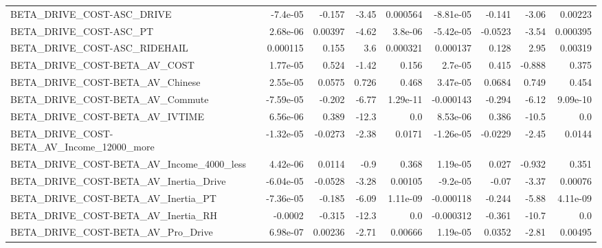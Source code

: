 \begin{tabular}{lrrrrrrrr}
BETA\_DRIVE\_COST-ASC\_DRIVE                          &    -7.4e-05 &       -0.157 &    -3.45 & 0.000564 &  -8.81e-05 &      -0.141 &        -3.06 &       0.00223 \\
BETA\_DRIVE\_COST-ASC\_PT                             &    2.68e-06 &      0.00397 &    -4.62 &  3.8e-06 &  -5.42e-05 &     -0.0523 &        -3.54 &      0.000395 \\
BETA\_DRIVE\_COST-ASC\_RIDEHAIL                       &    0.000115 &        0.155 &      3.6 & 0.000321 &   0.000137 &       0.128 &         2.95 &       0.00319 \\
BETA\_DRIVE\_COST-BETA\_AV\_COST                       &    1.77e-05 &        0.524 &    -1.42 &    0.156 &    2.7e-05 &       0.415 &       -0.888 &         0.375 \\
BETA\_DRIVE\_COST-BETA\_AV\_Chinese                    &    2.55e-05 &       0.0575 &    0.726 &    0.468 &   3.47e-05 &      0.0684 &        0.749 &         0.454 \\
BETA\_DRIVE\_COST-BETA\_AV\_Commute                    &   -7.59e-05 &       -0.202 &    -6.77 & 1.29e-11 &  -0.000143 &      -0.294 &        -6.12 &      9.09e-10 \\
BETA\_DRIVE\_COST-BETA\_AV\_IVTIME                     &    6.56e-06 &        0.389 &    -12.3 &      0.0 &   8.53e-06 &       0.386 &        -10.5 &           0.0 \\
BETA\_DRIVE\_COST-BETA\_AV\_Income\_12000\_more          &   -1.32e-05 &      -0.0273 &    -2.38 &   0.0171 &  -1.26e-05 &     -0.0229 &        -2.45 &        0.0144 \\
BETA\_DRIVE\_COST-BETA\_AV\_Income\_4000\_less           &    4.42e-06 &       0.0114 &     -0.9 &    0.368 &   1.19e-05 &       0.027 &       -0.932 &         0.351 \\
BETA\_DRIVE\_COST-BETA\_AV\_Inertia\_Drive              &   -6.04e-05 &      -0.0528 &    -3.28 &  0.00105 &   -9.2e-05 &       -0.07 &        -3.37 &       0.00076 \\
BETA\_DRIVE\_COST-BETA\_AV\_Inertia\_PT                 &   -7.36e-05 &       -0.185 &    -6.09 & 1.11e-09 &  -0.000118 &      -0.244 &        -5.88 &      4.11e-09 \\
BETA\_DRIVE\_COST-BETA\_AV\_Inertia\_RH                 &     -0.0002 &       -0.315 &    -12.3 &      0.0 &  -0.000312 &      -0.361 &        -10.7 &           0.0 \\
BETA\_DRIVE\_COST-BETA\_AV\_Pro\_Drive                  &    6.98e-07 &      0.00236 &    -2.71 &  0.00666 &   1.19e-05 &      0.0352 &        -2.81 &       0.00495 \\

\end{tabular}
